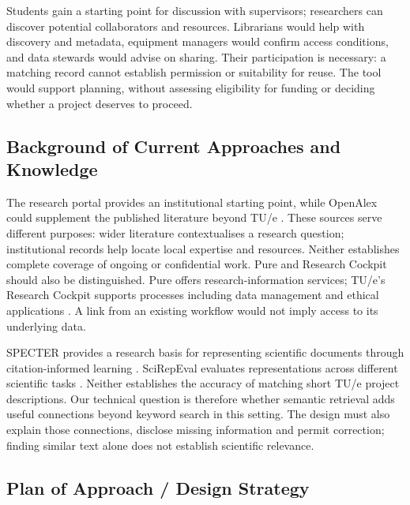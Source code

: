 \documentclass[11pt,a4paper]{article}
\begin{document}
Students gain a starting point for discussion with supervisors; researchers can discover potential collaborators and resources. Librarians would help with discovery and metadata, equipment managers would confirm access conditions, and data stewards would advise on sharing. Their participation is necessary: a matching record cannot establish permission or suitability for reuse. The tool would support planning, without assessing eligibility for funding or deciding whether a project deserves to proceed.

\subsection*{Background of Current Approaches and Knowledge}

The research portal provides an institutional starting point, while OpenAlex could supplement the published literature beyond TU/e \citep{openalex2026}. These sources serve different purposes: wider literature contextualises a research question; institutional records help locate local expertise and resources. Neither establishes complete coverage of ongoing or confidential work. Pure and Research Cockpit should also be distinguished. Pure offers research-information services; TU/e's Research Cockpit supports processes including data management and ethical applications \citep{pureapi,tuerdm}. A link from an existing workflow would not imply access to its underlying data.

SPECTER provides a research basis for representing scientific documents through citation-informed learning \citep{cohan2020}. SciRepEval evaluates representations across different scientific tasks \citep{singh2023}. Neither establishes the accuracy of matching short TU/e project descriptions. Our technical question is therefore whether semantic retrieval adds useful connections beyond keyword search in this setting. The design must also explain those connections, disclose missing information and permit correction; finding similar text alone does not establish scientific relevance.

\subsection*{Plan of Approach / Design Strategy}
\end{document}
